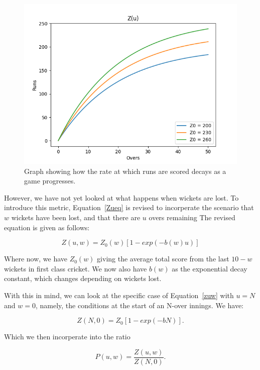 \begin{figure}[h]
    \centering
    \includegraphics[scale=0.6]{figures/z(u).png}
    \caption{Graph showing how the rate at which runs are scored decays as a game progresses.}
    \label{Zugraph}
\end{figure}

However, we have not yet looked at what happens when wickets are lost. To introduce this metric, Equation~\ref{Zueq}
is revised to incorperate the scenario that $w$ wickets have been lost, and that there are $u$ overs remaining
The revised equation is given as follows:

\begin{equation}
    Z(u,w) = Z_0(w)[1-exp(-b(w)u)]
    \label{zuw}
\end{equation}

Where now, we have $Z_0(w)$ giving the average total score from the last $10-w$ wickets in first class cricket.
We now also have $b(w)$ as the exponential decay constant, which changes depending on wickets lost.

With this in mind, we can look at the specific case of Equation~\ref{zuw} with $u=N$ and $w=0$, namely, the conditions
at the start of an N-over innings. We have:

\begin{equation}
    Z(N,0) = Z_0[1-exp(-bN)].
    \label{zstart}
\end{equation}

Which we then incorperate into the ratio

\begin{equation}
    P(u,w) = \frac{Z(u,w)}{Z(N,0)}.
    \label{prat}
\end{equation}

